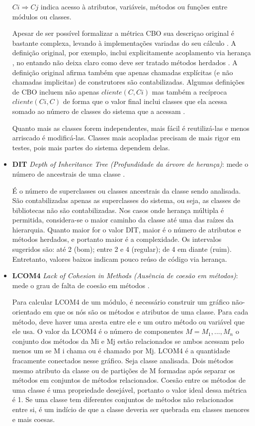 \begin{itemize}
$ Ci \Rightarrow Cj $ indica acesso à atributos, variáveis, métodos ou funções
entre módulos ou classes.

Apesar de ser possível formalizar a métrica CBO sua descriçao original é
bastante complexa, levando à implementações variadas do seu cálculo
\cite{Lincke2008}. A definição original, por exemplo, inclui explicitamente
acoplamento via herança \cite{Harrison1998}, no entando não deixa claro como
deve ser tratado métodos herdados \cite{Briand1999}. A definição original
afirma também que apenas chamadas explícitas (e não chamadas implicitas) de
construtores são contabilizadas. Algumas definições de CBO incluem não apenas $
cliente(C, Ci) $ mas também a recíproca $ cliente(Ci, C) $ de forma que o valor
final inclui classes que ela acessa somado ao número de classes do sistema que
a acessam \cite{Sant2008}.

Quanto mais as classes forem independentes, mais fácil é reutilizá-las e menos
arriscado é modificá-las. Classes mais acopladas precisam de mais rigor em
testes, pois mais partes do sistema dependem delas.

  \item {\bf DIT} {\it Depth of Inheritance Tree (Profundidade da árvore de
    herança)}: mede o número de ancestrais de uma classe \cite{Shih1997}.

É o número de superclasses ou classes ancestrais da classe sendo analisada. São
contabilizadas apenas as superclasses do sistema, ou seja, as classes de
bibliotecas não são contabilizadas. Nos casos onde herança múltipla é
permitida, considera-se o maior caminho da classe até uma das raízes da
hierarquia. Quanto maior for o valor DIT, maior é o número de atributos e
métodos herdados, e portanto maior é a complexidade. Os intervalos sugeridos
são: até 2 (bom); entre 2 e 4 (regular); de 4 em diante (ruim). Entretanto,
valores baixos indicam pouco reúso de código via herança.

  \item {\bf LCOM4} {\it Lack of Cohesion in Methods (Ausência de coesão em
    métodos)}: mede o grau de falta de coesão em métodos \cite{Hitz1995}.

Para calcular LCOM4 de um módulo, é necessário construir um gráfico
não-orientado em que os nós são os métodos e atributos de uma classe. Para cada
método, deve haver uma aresta entre ele e um outro método ou variável que ele
usa. O valor da LCOM4 é o número de componentes $ M = {M_{1}, ..., M_{n} } $ o
conjunto dos métodos da Mi e Mj estão relacionados se ambos acessam pelo menos
um se M i chama ou é chamado por Mj. LCOM4 é a quantidade fracamente conectados
nesse gráfico. Seja classe analisada. Dois métodos mesmo atributo da classe ou
de partições de M formadas após separar os métodos em conjuntos de métodos
relacionados.  Coesão entre os métodos de uma classe é uma propriedade
desejável, portanto o valor ideal dessa métrica é 1. Se uma classe tem
diferentes conjuntos de métodos não relacionados entre si, é um indício de que
a classe deveria ser quebrada em classes menores e mais coesas.


\end{itemize}
